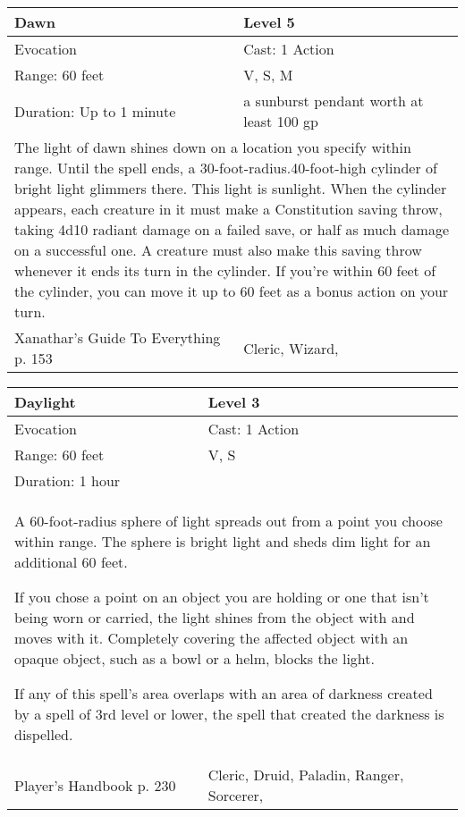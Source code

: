 \documentclass[11pt]{report}
\begin{document}
\begin{table}[H]
	\begin{tabular}{||p{6cm}|p{6cm}||}
		\hline\hline
		\bf{Dawn} & Level 5\\ \hline
		Evocation & Cast: 1 Action\\ \hline
		Range: 60 feet & V, S, M\\ \hline
		Duration: Up to 1 minute & a sunburst pendant worth at least 100 gp\\ \hline
		\multicolumn{2}{||p{12cm}||}{The light of dawn shines down on a location you specify within range. Until the spell ends, a 30-foot-radius.40-foot-high cylinder of bright light glimmers there. This light is sunlight. When the cylinder appears, each creature in it must make a Constitution saving throw, taking 4d10 radiant damage on a failed save, or half as much damage on a successful one. A creature must also make this saving throw whenever it ends its turn in the cylinder. If you’re within 60 feet of the cylinder, you can move it up to 60 feet as a bonus action on your turn.}\\ \hline
Xanathar's Guide To Everything p. 153 & Cleric, Wizard, \\ \hline\hline
	\end{tabular}
\end{table}

\begin{table}[H]
	\begin{tabular}{||p{6cm}|p{6cm}||}
		\hline\hline
		\bf{Daylight} & Level 3\\ \hline
		Evocation & Cast: 1 Action\\ \hline
		Range: 60 feet & V, S\\ \hline
		Duration: 1 hour & \\ \hline
		\multicolumn{2}{||p{12cm}||}{A 60-foot-radius sphere of light spreads out from a point you choose within range. 
The sphere is bright light and sheds dim light for an additional 60 feet. 

If you chose a point on an object you are holding or one that isn’t being worn or carried, the light shines from the object with and moves with it. Completely covering the affected object with an opaque object, such as a bowl or a helm, blocks the light. 

If any of this spell’s area overlaps with an area of darkness created by a spell of 3rd level or lower, the spell that created the darkness is dispelled.}\\ \hline
Player's Handbook p. 230 & Cleric, Druid, Paladin, Ranger, Sorcerer, \\ \hline\hline
	\end{tabular}
\end{table}
\end{document}
